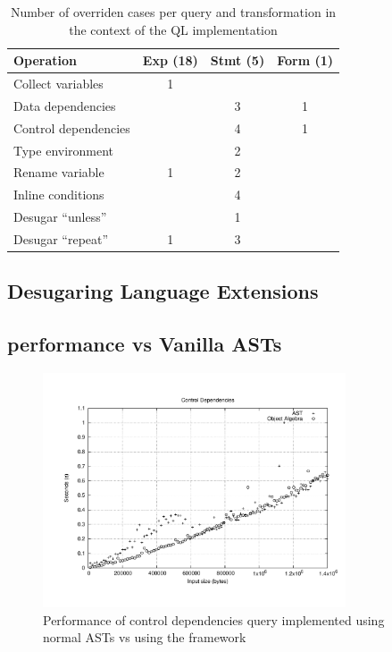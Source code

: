 \begin{table}[t]
  \centering
  \begin{tabular}{l|c|c|c}
    Operation            & Exp (18) & Stmt (5) & Form (1) \\\hline
    Collect variables    & 1              &                &               \\
    Data dependencies    &                & 3               & 1             \\
    Control dependencies &                & 4              & 1             \\
    Type environment     &                & 2              &               \\\hline
    Rename variable      & 1              & 2              &               \\
    Inline conditions    &                & 4              &               \\
    Desugar ``unless''   &                & 1              &               \\
    Desugar ``repeat''   & 1              & 3              &               \\
  \end{tabular}
  \caption{Number of overriden cases per query and transformation in
    the context of the QL implementation\label{TBL:qlresults}}
\end{table}


\subsection{Desugaring Language Extensions}



\subsection{\name performance vs Vanilla ASTs}


\begin{figure}
  \centering
  \includegraphics[width=0.8\textwidth]{controldeps}
  \caption{Performance of control dependencies query implemented using normal ASTs vs using the \name framework\label{FIG:perfControlDeps}}
\end{figure}

